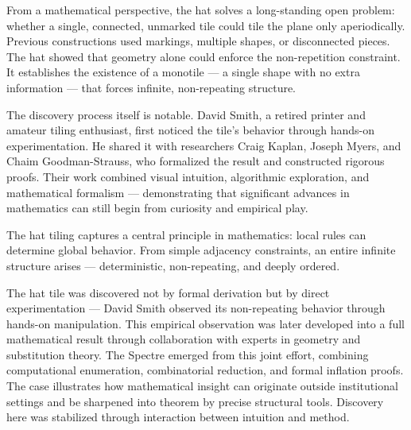 From a mathematical perspective, the hat solves a long-standing open problem: whether a single, connected, unmarked tile could tile the plane only aperiodically. Previous constructions used markings, multiple shapes, or disconnected pieces. The hat showed that geometry alone could enforce the non-repetition constraint. It establishes the existence of a monotile — a single shape with no extra information — that forces infinite, non-repeating structure.

The discovery process itself is notable. David Smith, a retired printer and amateur tiling enthusiast, first noticed the tile’s behavior through hands-on experimentation. He shared it with researchers Craig Kaplan, Joseph Myers, and Chaim Goodman-Strauss, who formalized the result and constructed rigorous proofs. Their work combined visual intuition, algorithmic exploration, and mathematical formalism — demonstrating that significant advances in mathematics can still begin from curiosity and empirical play.

The hat tiling captures a central principle in mathematics: local rules can determine global behavior. From simple adjacency constraints, an entire infinite structure arises — deterministic, non-repeating, and deeply ordered.
\clearpage

\begin{commentary}
The hat tile was discovered not by formal derivation but by direct experimentation — David Smith observed its non-repeating behavior through hands-on manipulation. This empirical observation was later developed into a full mathematical result through collaboration with experts in geometry and substitution theory. The Spectre emerged from this joint effort, combining computational enumeration, combinatorial reduction, and formal inflation proofs. The case illustrates how mathematical insight can originate outside institutional settings and be sharpened into theorem by precise structural tools. Discovery here was stabilized through interaction between intuition and method.
\end{commentary}


